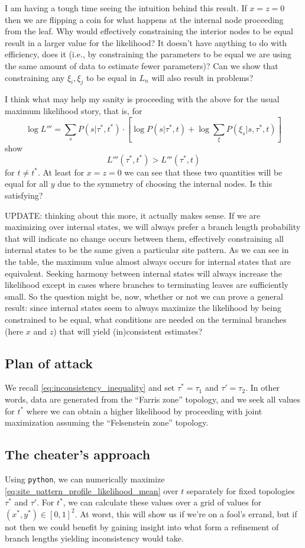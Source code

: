 \documentclass[a4paper]{article}
\begin{document}
I am having a tough time seeing the intuition behind this result.
If $x=z=0$ then we are flipping a coin for what happens at the internal node proceeding from the leaf.
Why would effectively constraining the interior nodes to be equal result in a larger value for the likelihood?
It doesn't have anything to do with efficiency, does it (i.e., by constraining the parameters to be equal we are using the same amount of data to estimate fewer parameters)?
Can we show that constraining any $\xi_i,\xi_j$ to be equal in $L_n$ will also result in problems?

I think what may help my sanity is proceeding with the above for the usual maximum likelihood story, that is, for
$$
\log L''' = \sum_{s} P(s | \tau^*, t^*) \cdot [\log P(s | \tau^*, t) + \log\sum_{\xi} P(\xi_s | s, \tau^*, t)]
$$
show
$$
L'''(\tau^*, t^*) > L'''(\tau^*, t)
$$
for $t\neq t^*$.
At least for $x=z=0$ we can see that these two quantities will be equal for all $y$ due to the symmetry of choosing the internal nodes.
Is this satisfying?

UPDATE: thinking about this more, it actually makes sense.
If we are maximizing over internal states, we will always prefer a branch length probability that will indicate no change occurs between them, effectively constraining all internal states to be the same given a particular site pattern.
As we can see in the table, the maximum value almost always occurs for internal states that are equivalent.
Seeking harmony between internal states will always increase the likelihood except in cases where branches to terminating leaves are sufficiently small.
So the question might be, now, whether or not we can prove a general result: since internal states seem to always maximize the likelihood by being constrained to be equal, what conditions are needed on the terminal branches (here $x$ and $z$) that will yield (in)consistent estimates?


\subsection{Plan of attack}

We recall \eqref{eq:inconsistency_inequality} and set $\tau^*=\tau_1$ and $\tau'=\tau_2$.
In other words, data are generated from the ``Farris zone'' topology, and we seek all values for $t^*$ where we can obtain a higher likelihood by proceeding with joint maximization assuming the ``Felsenstein zone'' topology.

\subsection{The cheater's approach}

Using \texttt{python}, we can numerically maximize \eqref{eq:site_pattern_profile_likelihood_mean} over $t$ separately for fixed topologies $\tau^*$ and $\tau'$.
For $t^*$, we can calculate these values over a grid of values for $(x^*, y^*)\in[0,1]^2$.
At worst, this will show us if we're on a fool's errand, but if not then we could benefit by gaining insight into what form a refinement of branch lengths yielding inconsistency would take.
\end{document}
